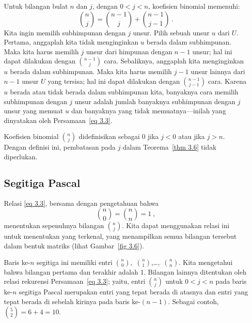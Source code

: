 \begin{theorem}\label{thm 3.6}                 
Untuk bilangan bulat $n$ dan $j$, dengan $0 < j < n$, koefisien binomial memenuhi:
\begin{equation} {n \choose j} = {{n-1} \choose j} + {{n-1} \choose {j - 1}}\ .
\label{eq 3.3}                                                                              
\end{equation}
\proof Kita ingin memilih subhimpunan dengan $j$ unsur.  Pilih sebuah unsur $u$ dari
$U$.  Pertama, anggaplah kita tidak menginginkan $u$ berada dalam subhimpunan.  Maka
kita harus memilih $j$ unsur dari himpunan dengan $n - 1$ unsur; hal ini dapat dilakukan
dengan ${{n-1} \choose j}$ cara.  Sebaliknya, anggaplah kita menginginkan $u$ berada
dalam subhimpunan.  Maka kita harus memilih $j - 1$ unsur lainnya dari $n - 1$ unsur
$U$ yang tersisa; hal ini dapat dilakukan dengan ${{n-1} \choose {j - 1}}$ cara.
Karena $u$ berada atau tidak berada dalam subhimpunan kita, banyaknya cara memilih
subhimpunan dengan $j$ unsur adalah jumlah banyaknya subhimpunan dengan $j$ unsur yang
memuat $u$ dan banyaknya yang tidak memuatnya---inilah yang dinyatakan oleh
Persamaan~\ref{eq 3.3}.
\end{theorem}

Koefisien binomial $n \choose j$ didefinisikan sebagai 0 jika $j < 0$ atau jika
$j > n$.  Dengan definisi ini, pembatasan pada $j$ dalam Teorema~\ref{thm 3.6} tidak
diperlukan.

\subsection*{Segitiga Pascal}

Relasi \ref{eq 3.3}, bersama dengan pengetahuan bahwa
$$ {n \choose 0} = {n \choose n }= 1\ ,
$$ menentukan sepenuhnya bilangan $n \choose j$.  Kita dapat menggunakan relasi ini
untuk menentukan  yang terkenal, yang
menampilkan semua bilangan tersebut dalam bentuk matriks (lihat Gambar~\ref{fig 3.6}).


Baris ke-$n$ segitiga ini memiliki entri $n \choose 0$,~$n \choose 1$,\dots,~$n
\choose n$.   Kita mengetahui bahwa bilangan pertama dan terakhir adalah 1.  Bilangan
lainnya ditentukan oleh relasi rekurensi Persamaan~\ref{eq 3.3}; yaitu, entri
${n \choose j}$ untuk $0 < j < n$ pada baris ke-$n$ segitiga Pascal merupakan
 entri yang tepat berada di atasnya dan entri yang tepat berada di sebelah
kirinya pada baris ke-$(n - 1)$.  Sebagai contoh, ${5 \choose 2} = 6 + 4 = 10$.

